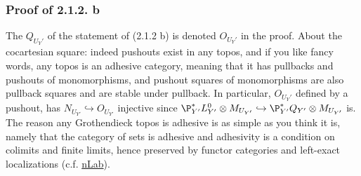 \documentclass[deligne.tex]{subfiles}
\begin{document}
\subsubsection*{Proof of 2.1.2. b}
The $Q_{U_Y'}$ of the statement of (2.1.2 b) is denoted $O_{U_Y'}$ in the
proof. About the cocartesian square: indeed pushouts exist in any topos, and
if you like fancy words, any topos is an adhesive category, meaning that it
has pullbacks and pushouts of monomorphisms, and pushout squares of monomorphisms are also pullback squares and are stable under pullback.
In particular, $O_{U_Y'}$ defined by a pushout, has
$N_{U_{Y'}}\hookrightarrow O_{U_{Y'}}$ injective since
$\P_{Y'}^*L^0_{Y'}\otimes M_{U_{Y'}}\hookrightarrow \P_{Y'}^*Q_{Y'}\otimes M_{U_{Y'}}$ is.
The reason any Grothendieck topos is adhesive is as simple as you think it
is, namely that the category of sets is adhesive and adhesivity is a
condition on colimits and finite limits, hence preserved by functor
categories and left-exact localizations
(c.f. \href{https://ncatlab.org/nlab/show/adhesive+category}{nLab}).
\end{document}
